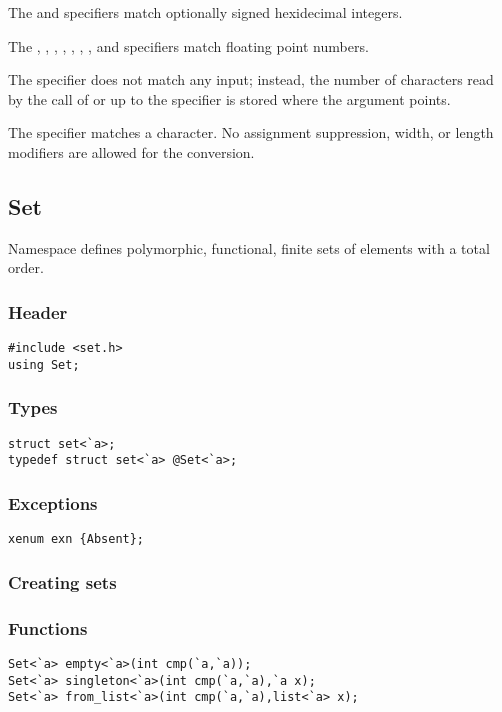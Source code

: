 The  and  specifiers match optionally signed hexidecimal
integers.

The , , , , , ,
, and  specifiers match floating point numbers.

The  specifier does not match any input; instead, the number of
characters read by the call of  or  up to the
 specifier is stored where the argument points.

The \code{\%} specifier matches a \code{\%} character.  No assignment
suppression, width, or length modifiers are allowed for the \code{\%}
conversion.

\subsection{Set}

Namespace  defines polymorphic, functional, finite sets of
elements with a total order.

\subsubsection*{Header}
\begin{verbatim}
#include <set.h>
using Set;
\end{verbatim}

\subsubsection*{Types}
\begin{verbatim}
struct set<`a>;
typedef struct set<`a> @Set<`a>;
\end{verbatim}

\subsubsection*{Exceptions}
\begin{verbatim}
xenum exn {Absent};
\end{verbatim}

\subsubsection*{Creating sets}

\subsubsection*{Functions}
\begin{verbatim}
Set<`a> empty<`a>(int cmp(`a,`a));
Set<`a> singleton<`a>(int cmp(`a,`a),`a x);
Set<`a> from_list<`a>(int cmp(`a,`a),list<`a> x);
\end{verbatim}

